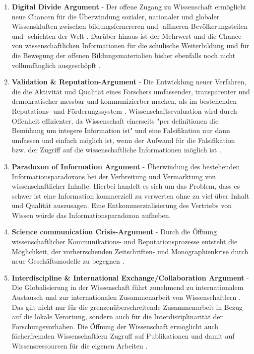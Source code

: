 \begin{enumerate}
\item \textbf{Digital Divide Argument} - Der offene Zugang zu Wissenschaft ermöglicht neue Chancen für die Überwindung sozialer, nationaler und globaler Wissenskluften \cite{suchen} zwischen bildungsfernereren und -affineren Bevölkerungsteilen und -schichten der Welt \cite{boai_2012}. Darüber hinaus ist der Mehrwert und die Chance von wissenschaftlichen Informationen für die schulische Weiterbildung und für die Bewegung der offenen Bildungsmaterialien bisher ebenfalls noch nicht vollumfänglich ausgeschöpft \cite{heise_lernen_2013}.
\item \textbf{Validation & Reputation-Argument} - Die Entwicklung neuer Verfahren, die die Aktivität und Qualität eines Forschers umfassender, transparenter und demokratischer messbar und kommunizierber machen, als im bestehenden Reputations- und Förderungssystem \cite{chalmers_2009_avoidable_waste}. Wissenschaftsevaluation wird durch Offenheit effizienter, da Wissenschaft einerseits "per definitionen die Bemühung um integere Information ist" \cite{umstatter_2007_qualitatssicherung} und eine Falsifikation nur dann umfassen und einfach möglich ist, wenn der Aufwand für die Falsifikation bzw. der Zugriff auf die wissenschaftliche Informationen möglich ist \cite{umstatter_2007_qualitatssicherung}.
\item \textbf{Paradoxon of Information Argument} - Überwindung des bestehenden Informationsparadoxons bei der Verbreitung und Vermarktung von wissenschaftlicher Inhalte. Hierbei handelt es sich um das Problem, dass es schwer ist eine Information kommerziell zu verwerten ohne zu viel über Inhalt und Qualität auszusagen. Eine Entkommerzialisierung des Vertriebs von Wissen  würde das Informationsparadoxon aufheben.
\item \textbf{Science communication Crisis-Argument} - Durch die Öffnung wissenschaftlicher Kommunikations- und Reputationsprozesse entsteht die Möglichkeit, der vorherrschenden Zeitschriften- und Monographienkrise durch neue Geschäftsmodelle zu begegnen \cite{suchen}.
\item \textbf{Interdiscipline & International Exchange/Collaboration Argument} - Die Globalisierung in der Wissenschaft führt zunehmend zu internationalem Austausch und zur internationalen Zusammenarbeit von Wissenschaftlern \cite{Waltman_2011}. Das gilt nicht nur für die grenzenüberschreitende Zusammenarbeit in Bezug auf die lokale Verortung, sondern auch für die Interdisziplinarität der Forschungsvorhaben. Die Öffnung der Wissenschaft ermöglicht auch fächerfremden Wissenschaftlern Zugruff auf Publikationen und damit auf Wissensressourcen für die eigenen Arbeiten \cite{suchen}.

\end{enumerate}
